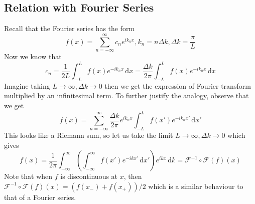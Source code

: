 \subsection{Relation with Fourier Series}
Recall that the Fourier series has the form
$$f(x)=\sum_{n=-\infty}^\infty c_ne^{ik_nx},k_n=n\Delta k,\Delta k=\frac{\pi}{L}$$
Now we know that
$$c_n=\frac{1}{2L}\int_{-L}^Lf(x)e^{-ik_nx}\,\mathrm dx=\frac{\Delta k}{2\pi}\int_{-L}^Lf(x)e^{-ik_nx}\,\mathrm dx$$
Imagine taking $L\to\infty,\Delta k\to 0$ then we get the expression of Fourier transform multiplied by an infinitesimal term.
To further justify the analogy, observe that we get
$$f(x)=\sum_{n=-\infty}^\infty\frac{\Delta k}{2\pi}e^{ik_nx}\int_{-L}^Lf(x')e^{-ik_nx'}\,\mathrm dx'$$
This looks like a Riemann sum, so let us take the limit $L\to\infty,\Delta k\to 0$ which gives
$$f(x)=\frac{1}{2\pi}\int_{-\infty}^\infty \left( \int_{-\infty}^\infty f(x')e^{-ikx'}\,\mathrm dx' \right)e^{ikx}\,\mathrm dk=\mathcal F^{-1}\circ\mathcal F(f)(x)$$
Note that when $f$ is discontinuous at $x$, then $\mathcal F^{-1}\circ\mathcal F(f)(x)=(f(x_-)+f(x_+))/2$ which is a similar behaviour to that of a Fourier series.
